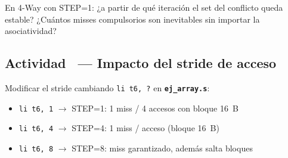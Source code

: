\documentclass[12pt, a4paper]{article}
\newcommand{\archivo}[1]{\texttt{\textbf{#1}}}
\newcounter{actnum}
\newcommand{\actividadsec}[1]{%
  \stepcounter{actnum}%
  \subsection{Actividad \theactnum\ — #1}%
}
\begin{document}
\begin{checkpoint}
    En 4-Way con STEP=1: ¿a partir de qué iteración el set del conflicto queda estable?
    ¿Cuántos misses compulsorios son inevitables sin importar la asociatividad?
\end{checkpoint}
\newpage
\actividadsec{Impacto del stride\protect\footnotemark{} de acceso}

\begin{nota}
    Modificar el stride cambiando \texttt{li t6, ?} en \archivo{ej\_array.s}:
    \begin{itemize}
        \item \texttt{li t6, 1} $\to$ STEP=1: 1 miss / 4 accesos con bloque 16~B
        \item \texttt{li t6, 4} $\to$ STEP=4: 1 miss / acceso (bloque 16~B)
        \item \texttt{li t6, 8} $\to$ STEP=8: miss garantizado, además salta bloques
    \end{itemize}
\end{nota}
\end{document}
